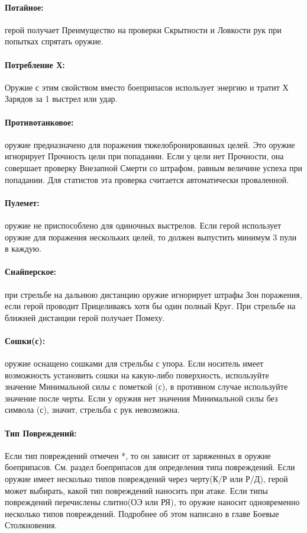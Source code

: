 \paragraph{Потайное:} герой получает Преимущество на проверки Скрытности и Ловкости рук при попытках спрятать оружие.
\paragraph{Потребление Х:} Оружие с этим свойством вместо боеприпасов использует энергию и тратит Х Зарядов за 1 выстрел или удар.
\paragraph{Противотанковое:} оружие предназначено для поражения тяжелобронированных целей. Это оружие игнорирует Прочность цели при попадании. Если у цели нет Прочности, она совершает проверку Внезапной Смерти со штрафом, равным величине успеха при попадании. Для статистов эта проверка считается автоматически проваленной.
\paragraph{Пулемет:} оружие не приспособлено для одиночных выстрелов. Если герой использует оружие для поражения нескольких целей, то должен выпустить минимум 3 пули в каждую.
\paragraph{Снайперское:} при стрельбе на дальнюю дистанцию оружие игнорирует штрафы Зон поражения, если герой проводит Прицеливаясь хотя бы один полный Круг. При стрельбе на ближней дистанции герой получает Помеху.
\paragraph{Сошки(с):} оружие оснащено сошками для стрельбы с упора. Если носитель имеет возможность установить сошки на какую-либо поверхность, используйте значение Минимальной силы с пометкой (с), в противном случае используйте значение после черты. Если у оружия нет значения Минимальной силы без символа (с), значит, стрельба с рук невозможна.
\paragraph{Тип Повреждений:}

\newline
Если тип повреждений отмечен *, то он зависит от заряженных в оружие боеприпасов. См. раздел боеприпасов для определения типа повреждений.
\newline
Если оружие имеет несколько типов повреждений через черту(К/Р или Р/Д), герой может выбирать, какой тип повреждений наносить при атаке. Если типы повреждений перечислены слитно(ОЭ или РЯ), то оружие наносит одновременно несколько типов повреждений. Подробнее об этом написано в главе Боевые Столкновения.
